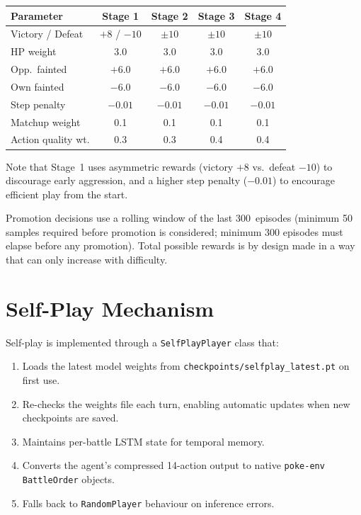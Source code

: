 \begin{center}
\small
\begin{tabularx}{\textwidth}{l c c c c}
  \toprule
  \textbf{Parameter} & \textbf{Stage 1} & \textbf{Stage 2} & \textbf{Stage 3} & \textbf{Stage 4} \\
  \midrule
  Victory / Defeat   & $+8$ / $-10$ & $\pm 10$ & $\pm 10$ & $\pm 10$ \\
  HP weight          & 3.0   & 3.0   & 3.0   & 3.0   \\
  Opp.\ fainted      & $+6.0$ & $+6.0$ & $+6.0$ & $+6.0$ \\
  Own fainted        & $-6.0$ & $-6.0$ & $-6.0$ & $-6.0$ \\
  Step penalty       & $-0.01$ & $-0.01$ & $-0.01$ & $-0.01$ \\
  Matchup weight     & 0.1   & 0.1   & 0.1   & 0.1   \\
  Action quality wt. & 0.3   & 0.3   & 0.4   & 0.4   \\
  \bottomrule
\end{tabularx}
\end{center}

Note that Stage~1 uses asymmetric rewards (victory $+8$ vs.\ defeat $-10$) to
discourage early aggression, and a higher step penalty ($-0.01$) to encourage
efficient play from the start.

Promotion decisions use a rolling window of the last 300~episodes (minimum 50
samples required before promotion is considered; minimum 300 episodes must
elapse before any promotion). Total possible rewards is by design made in a way that can only increase with difficulty.

\section{Self-Play Mechanism}
\label{sec:self_play}

Self-play is implemented through a \texttt{SelfPlayPlayer} class that:

\begin{enumerate}
  \item Loads the latest model weights from
        \texttt{checkpoints/selfplay\_latest.pt} on first use.
  \item Re-checks the weights file each turn, enabling automatic updates
        when new checkpoints are saved.
  \item Maintains per-battle LSTM state for temporal memory.
  \item Converts the agent's compressed 14-action output to native
        \texttt{poke-env} \texttt{BattleOrder} objects.
  \item Falls back to \texttt{RandomPlayer} behaviour on inference errors.
\end{enumerate}

